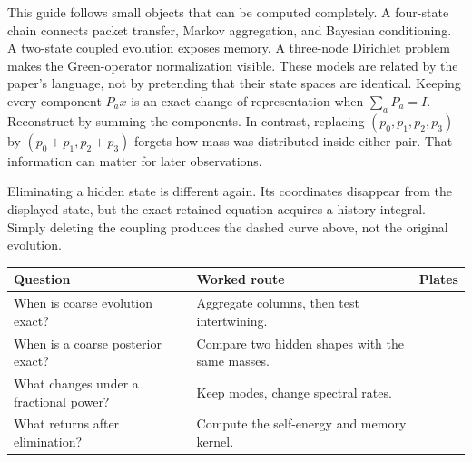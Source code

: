 \begingroup
{}\fontsize{10.5}{12.6}\selectfont
\setlength{\parskip}{4pt}
\setlength{\abovedisplayskip}{6pt}\setlength{\belowdisplayskip}{6pt}
This guide follows small objects that can be computed completely. A four-state chain connects packet transfer, Markov aggregation, and Bayesian conditioning. A two-state coupled evolution exposes memory. A three-node Dirichlet problem makes the Green-operator normalization visible. These models are related by the paper's language, not by pretending that their state spaces are identical.
Keeping every component $P_a x$ is an exact change of representation when $\sum_aP_a=I$. Reconstruct by summing the components. In contrast, replacing $(p_0,p_1,p_2,p_3)$ by $(p_0+p_1,p_2+p_3)$ forgets how mass was distributed inside either pair. That information can matter for later observations.

Eliminating a hidden state is different again. Its coordinates disappear from the displayed state, but the exact retained equation acquires a history integral. Simply deleting the coupling produces the dashed curve above, not the original evolution.
\begin{center}\small
\begin{tabularx}{\linewidth}{@{}lYl@{}}\toprule
Question & Worked route & Plates\\\midrule
When is coarse evolution exact? & Aggregate columns, then test intertwining. & \\
When is a coarse posterior exact? & Compare two hidden shapes with the same masses. & \\
What changes under a fractional power? & Keep modes, change spectral rates. & \\
What returns after elimination? & Compute the self-energy and memory kernel. & \\\bottomrule
\end{tabularx}\end{center}

